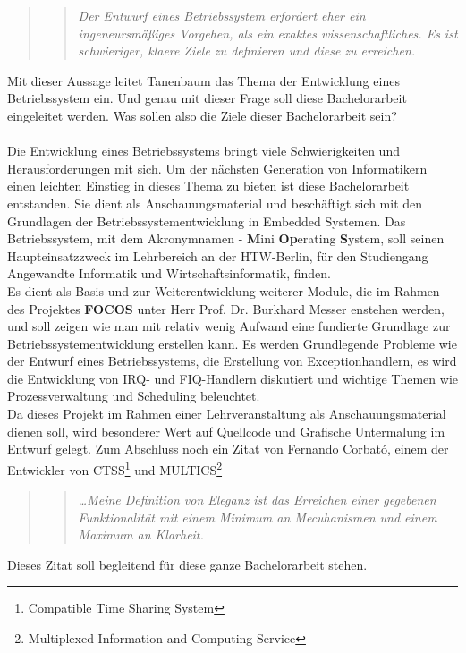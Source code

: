 \begin{quote}
\blockquote{\textit{Der Entwurf eines Betriebssystem erfordert eher ein ingeneursm\"a\ss iges Vorgehen, als ein exaktes wissenschaftliches. Es ist schwieriger, klaere Ziele zu definieren und diese zu erreichen.}}\parencite[911]{os}
\end{quote}
Mit dieser Aussage leitet Tanenbaum das Thema der Entwicklung eines Betriebssystem ein. Und genau mit dieser Frage soll diese Bachelorarbeit eingeleitet werden. Was sollen also die Ziele dieser Bachelorarbeit sein?\\\\
Die Entwicklung eines Betriebssystems bringt viele Schwierigkeiten und Herausforderungen mit sich. Um der n\"achsten Generation von Informatikern einen leichten Einstieg in dieses Thema zu bieten ist diese Bachelorarbeit entstanden. Sie dient als Anschauungsmaterial und besch\"aftigt sich mit den Grundlagen der Betriebssystementwicklung in Embedded Systemen. Das Betriebssystem, mit dem Akronymnamen \mops - \textbf{M}ini \textbf{Op}erating \textbf{S}ystem, soll seinen Haupteinsatzzweck im Lehrbereich an der HTW-Berlin, f\"ur den Studiengang Angewandte Informatik und Wirtschaftsinformatik, finden. \\
Es dient als Basis und zur Weiterentwicklung weiterer Module, die im Rahmen des Projektes \textbf{FOCOS} unter Herr Prof. Dr. Burkhard Messer enstehen werden, und soll zeigen wie man mit relativ wenig Aufwand eine fundierte Grundlage zur Betriebssystementwicklung erstellen kann. Es werden Grundlegende Probleme wie der Entwurf eines Betriebssystems, die Erstellung von Exceptionhandlern, es wird die Entwicklung von IRQ- und FIQ-Handlern diskutiert und wichtige Themen wie Prozessverwaltung und Scheduling beleuchtet.\\
Da dieses Projekt im Rahmen einer Lehrveranstaltung als Anschauungsmaterial dienen soll, wird besonderer Wert auf Quellcode und Grafische Untermalung im Entwurf gelegt. Zum Abschluss noch ein Zitat von Fernando Corbat\'o, einem der Entwickler von CTSS\footnote{Compatible Time Sharing System} und MULTICS\footnote{Multiplexed Information and Computing Service}
\begin{quote}
\blockquote{\textit{\ldots Meine Definition von Eleganz ist das Erreichen einer gegebenen Funktionalit\"at mit einem Minimum an Mecuhanismen und einem Maximum an Klarheit.}}\parencite[915]{os}
\end{quote}
Dieses Zitat soll begleitend f\"ur diese ganze Bachelorarbeit stehen.